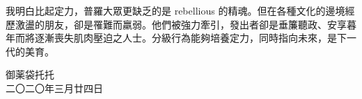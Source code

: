 \documentclass[10pt]{article}
\begin{document}
我明白比起定力，普羅大眾更缺乏的是 rebellious
的精魂。但在各種文化的邊境經歷激盪的朋友，卻是罹難而羸弱。他們被強力牽引，發出者卻是垂簾聽政、安享暮年而將逐漸喪失肌肉壓迫之人士。分級行為能夠培養定力，同時指向未來，是下一代的美育。



\vspace{3em}
\begin{flushleft}
\small{御薬袋托托\\
二〇二〇年三月廿四日}
\end{flushleft}
\end{document}
